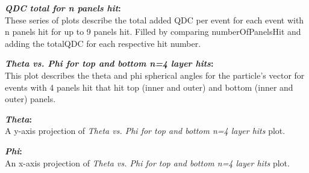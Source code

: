 \documentclass[a4paper,12pt]{article}
\begin{document}
\textbf{\emph{QDC total for n panels hit}:} \\
These series of plots describe the total added QDC per event for each event with n panels hit for up to 9 panels hit. Filled by comparing numberOfPanelsHit and adding the totalQDC for each respective hit number.

\pagebreak
\begin{figure}[h]
\centering
{}%
\end{figure}

\textbf{\emph{Theta vs. Phi for top and bottom n=4 layer hits}:} \\
This plot describes the theta and phi spherical angles for the particle's vector for events with 4 panels hit that hit top (inner and outer) and bottom (inner and outer) panels.

\textbf{\emph{Theta}:} \\
A y-axis projection of \emph{Theta vs. Phi for top and bottom n=4 layer hits} plot.

\textbf{\emph{Phi}:} \\
An x-axis projection of \emph{Theta vs. Phi for top and bottom n=4 layer hits} plot.

\pagebreak
\begin{figure}[h]
\centering
{}%
\end{figure}
\end{document}
